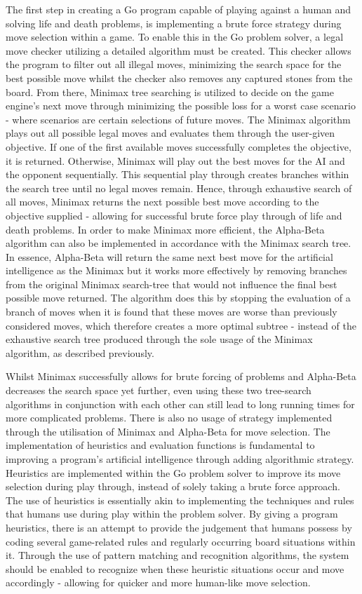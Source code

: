 \documentclass{l3proj}
\begin{document}
The first step in creating a Go program capable of playing against a human and solving life and death problems, is implementing a brute force strategy during move selection within a game. To enable this in the Go problem solver, a legal move checker utilizing a detailed algorithm must be created. This checker allows the program to filter out all illegal moves, minimizing the search space for the best possible move whilst the checker also removes any captured stones from the board. From there, Minimax tree searching is utilized to decide on the game engine's next move through minimizing the possible loss for a worst case scenario - where scenarios are certain selections of future moves. The Minimax algorithm plays out all possible legal moves and evaluates them through the user-given objective. If one of the first available moves successfully completes the objective, it is returned. Otherwise, Minimax will play out the best moves for the AI and the opponent sequentially. This sequential play through creates branches within the search tree until no legal moves remain. Hence, through exhaustive search of all moves, Minimax returns the next possible best move according to the objective supplied - allowing for successful brute force play through of life and death problems.
In order to make Minimax more efficient, the Alpha-Beta algorithm can also be implemented in accordance with the Minimax search tree. In essence, Alpha-Beta will return the same next best move for the artificial intelligence as the Minimax but it works more effectively by removing branches from the original Minimax search-tree that would not influence the final best possible move returned. The algorithm does this by stopping the evaluation of a branch of moves when it is found that these moves are worse than previously considered moves, which therefore creates a more optimal subtree - instead of the exhaustive search tree produced through the sole usage of the Minimax algorithm, as described previously.

Whilst Minimax successfully allows for brute forcing of problems and Alpha-Beta decreases the search space yet further, even using these two tree-search algorithms in conjunction with each other can still lead to long running times for more complicated problems. There is also no usage of strategy implemented through the utilisation of Minimax and Alpha-Beta for move selection. The implementation of heuristics and evaluation functions is fundamental to improving a program's artificial intelligence through adding algorithmic strategy. Heuristics are implemented within the Go problem solver to improve its move selection during play through, instead of solely taking a brute force approach. The use of heuristics is essentially akin to implementing the techniques and rules that humans use during play within the problem solver. By giving a program heuristics, there is an attempt to provide the judgement that humans possess by coding several game-related rules and regularly occurring board situations within it. Through the use of pattern matching and recognition algorithms, the system should be enabled to recognize when these heuristic situations occur and move accordingly - allowing for quicker and more human-like move selection.
\end{document}
